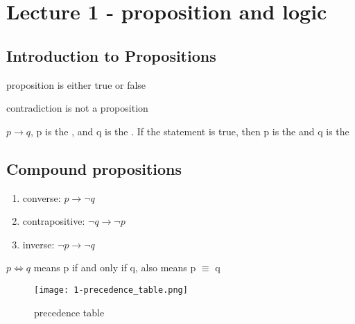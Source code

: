 \documentclass[../main.tex]{subfile}
\begin{document}
\section{Lecture 1 - proposition and logic}
\subsection{Introduction to Propositions}
\begin{definition}
	proposition is either true or false
\end{definition}
\begin{remark}
	contradiction is not a proposition	
\end{remark}


\begin{definition}
	$p \to q$, p is the , and q is the . If the statement is true, then p is the  and q is the 
\end{definition} 

\subsection{Compound propositions}
\begin{enumerate}
	\item converse: $p \to \neg q$
	\item contrapositive: $\neg q \to \neg p$
	\item inverse: $\neg p \to \neg q$
\end{enumerate}

\begin{definition}
$p \iff q$ means p if and only if q, also means p $\equiv$ q	
\end{definition}

\begin{figure}[h!]
\centering
\texttt{[image: 1-precedence\_table.png]}
\caption{precedence table}
\label{fig:}
\end{figure}
\end{document}

